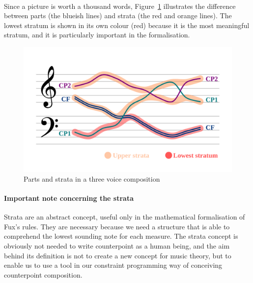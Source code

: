 \paragraph{}

Since a picture is worth a thousand words, Figure~\ref{fig:lowest} illustrates the difference between parts (the blueish lines) and strata (the red and orange lines). The lowest stratum is shown in its own colour (red) because it is the most meaningful stratum, and it is particularly important in the formalisation.

\begin{figure}[h]
  \centering
  \includegraphics[width=1\textwidth]{Images/strata_example.png}
  \caption{Parts and strata in a three voice composition}
  \label{fig:lowest}
\end{figure}

\paragraph*{Important note concerning the strata}
Strata are an abstract concept, useful only in the mathematical formalisation of Fux's rules. They are necessary because we need a structure that is able to comprehend the lowest sounding note for each measure.
The strata concept is obviously not needed to write counterpoint as a human being, and the aim behind its definition is not to create a new concept for music theory, but to enable us to use a tool in our constraint programming way of conceiving counterpoint composition.

